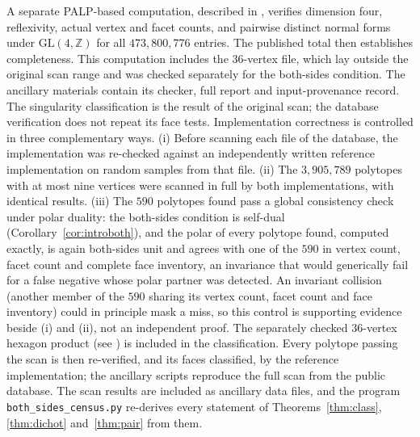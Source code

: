 \documentclass[11pt]{amsart}
\theoremstyle{definition}
\theoremstyle{remark}
\newcommand{\ZZ}{\mathbb{Z}}
\begin{document}
A separate PALP-based computation, described in \cite[\S6.1]{paper1},
verifies dimension four, reflexivity, actual vertex and facet counts, and
pairwise distinct normal forms under $\mathrm{GL}(4,\ZZ)$ for all
$473{,}800{,}776$ entries.  The published total
\cite{KreuzerSkarke00} then establishes completeness.  This computation
includes the $36$-vertex file, which lay outside the original scan range
and was checked separately for the both-sides condition.  The ancillary
materials contain its checker, full report and input-provenance record.
The singularity classification is the result of the original scan;
the database verification does not repeat its face tests.
Implementation correctness is controlled in
three complementary ways.
(i) Before scanning each file of the database, the implementation was
re-checked against an
independently written reference implementation on random samples from that
file.
(ii) The $3{,}905{,}789$ polytopes with at most nine vertices were scanned
in
full by both implementations, with identical results.  (iii) The $590$
polytopes found pass a global consistency check under polar duality: the
both-sides condition
is self-dual (Corollary~\ref{cor:introboth}), and the polar of every
polytope found,
computed exactly, is again both-sides unit and agrees with one of the
$590$ in vertex
count, facet count and complete face inventory, an invariance that
would generically fail for a false
negative whose polar partner was detected.  An invariant collision
(another member of the $590$ sharing its vertex count, facet count and
face inventory) could in principle mask a miss, so this control is
supporting evidence beside (i) and (ii), not an independent proof.
The separately checked $36$-vertex hexagon product
(see \cite[\S6.1]{paper1}) is included in the classification.
Every polytope passing the scan is then re-verified, and its faces
classified, by the reference implementation; the
ancillary scripts reproduce the full scan from the public database.  The
scan results are included as ancillary data files, and the program
\texttt{both\_sides\_census.py} re-derives every statement of
Theorems~\ref{thm:class}, \ref{thm:dichot} and~\ref{thm:pair} from them.
\end{document}
